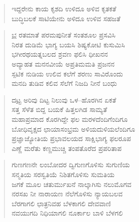 {\begin{verse}
ಇದ್ದರೇನು ಕಾಯ ಕೃಶದಿ ಉಳಿದೂ ಅಳಿವ ಕೃತಕತೆ\\
ಬುದ್ಧಿಬಲಕೆ ಸಾಟಿಯೇನು ಅಳಿದೂ ಉಳಿವ ಸಹಜತೆ
\end{verse}
\begin{verse}
\underline{ಭ} ರತಮಾತೆ ಪರಮಪುನೀತೆ ಸಂತಶೂಲ ಪ್ರಸವಿಸಿ\\
ನಿರತ ದುಡಿಮೆ ಭಾಗ್ಯ ಬಯಸಿ ಶಿಷ್ಯಕೋಟಿ ಕುಸುಮಿಸಿ\\
ಭಗೀರಥಯತ್ನಬಲದ ಶ್ರವಣ ಫಲಿಸಿ ಧೀಖನನ\\
ಅವ್ಯಾಹತ ಮನನವೀಯೆ ಅಪ್ರತಿಮಮತಿ ಪ್ರಜನನ\\
ಸ್ಪಟಿಕ ನುಡಿಯ ಉಲಿವ ಕಲೆಗೆ ಶರಣು ಸಾವಿರೊಂದು\\
ಮನದಿ ತುಡಿವ ಕಲಿವ ಸೆಲೆಗೆ ನಿಜದಿ ನೀನೆ ಬಂಧು
\end{verse}
\begin{verse}
ದ\underline{ಟ್ಟ} ಅರಿವು ದಿಟ್ಟ ನಿಲುವು ಒಳ–ಹೊರಗಿನ ಏಕತೆ\\
ಸತ್ತ ಸೆಳೆತ ಬಿದ್ದ ಬಯಕೆ ಹಿತ್ತಲಗಿಡ ಸಾಮ್ಯತೆ\\
ಮಹಾಪ್ರಮಾದ ಕೊರಗಿದ್ದೇ ಫಲ ಮರಳದೆಂದಿಗೆಂದಿಗೂ\\
ಬೋಧಿವೃಕ್ಷದ ಛಾಯಾಸಂಭ್ರಮ ಅಳಿಯದುಳಿಯಲೆಂದಿಗೂ\\
ಪ್ರಜ್ಞಾಜ್ಯೋತಿಯ ಪ್ರಭಾವಲಯದ ಸಾಕ್ಷಿಭಾಗ್ಯ ಫಲರೂಪ\\
ಎಣ್ಣೆ ಮರೆತು ಕಣ್ಣಮುಚ್ಚಿ ತಂಪತೊರೆದ ಪ್ರಪರಿತಾಪ
\end{verse}
\begin{verse}
ಗುಣಗಣನೇ ಲಂಬೋದರ ದ್ವಿಗುಣಗೊಳಿಸು ಸುಗುಣಿಯ\\
ಸನ್ಮತಿಯ ಸರಸ್ವತಿಯೆ ನಿಶಿತಗೊಳಿಸು ಸುಮತಿಯ\\
ಜಗಕೆ ಮೂಲ ಚತುರ್ಮುಖನೆ ನಾಲ್ಕಾಗಿಸು ನಲುಮೊಗವ\\
ನರಸಖ ನೀ ನಾರಾಯಣ ನೆಲೆಗೊಳಿಸು ನ್ಯಾಯಬಲವ\\
ಬೆರಗಾಗಲಿ ಛಾತ್ರನಿವಹ ಬೆಳಕಾಗಲಿ ದೇವವಾಣಿ\\
ನವಯುಗದಿ ನಿಧಿಯಾಗಲಿ ನೂರ್ಕಾಲ ಬಾಳಿ ಬೆಳಗಲಿ
\end{verse}
\articleend
}
